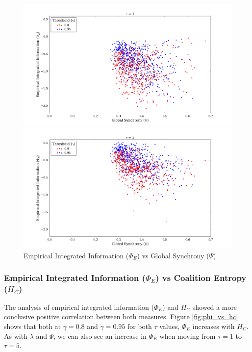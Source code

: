 \documentclass[a4paper,11pt]{article}
\begin{document}
\begin{figure}[H] 
	\begin{minipage}[b]{0.5\linewidth}
		\begin{center}
		\includegraphics[scale = 0.2]{figures/snn/phi_vs_psi_1}
		\end{center}
		\vspace{4ex}
	\end{minipage}
	\begin{minipage}[b]{0.5\linewidth}
		\begin{center}
		\includegraphics[scale = 0.2]{figures/snn/phi_vs_psi_5}
		\end{center}
		\vspace{4ex}
	\end{minipage}
	\caption{
		Empirical Integrated Information ($\Phi_E$) vs Global Synchrony ($\Psi$)
		\label{fig:phi_vs_psi}
	}
\end{figure}

\subsubsection{Empirical Integrated Information ($\Phi_E$) vs Coalition Entropy ($H_C$)}
\label{sec:app:snn:res:phi-hc}
The analysis of empirical integrated information ($\Phi_E$) and $H_C$ showed a more conclusive positive correlation between both measures. Figure \ref{fig:phi_vs_hc} shows that both at $\gamma = 0.8$ and $\gamma = 0.95$ for both $\tau$ values, $\Phi_E$ increases with $H_C$. As with $\lambda$ and $\Psi$, we can also see an increase in $\Phi_E$ when moving from $\tau = 1$ to $\tau = 5$.
\end{document}
